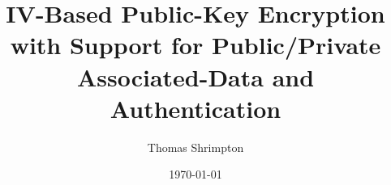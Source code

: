 \documentclass{llncs}
\begin{document}



\title{\vspace{-5mm} IV-Based Public-Key Encryption \\with Support
  for Public/Private Associated-Data and Authentication}


\ifnum{}
\author{
}

\date{\small \today} %
\else
\author{
Thomas Shrimpton
}

\fi




\maketitle

\begin{abstract} 
\end{abstract}








\ifnum{}
\appendix
%



\fi
\end{document}

